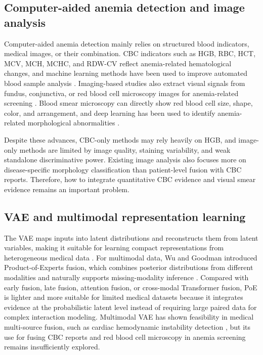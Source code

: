 \documentclass[conference,letterpaper]{IEEEtran}
\begin{document}
\subsection{Computer-aided anemia detection and image analysis}

Computer-aided anemia detection mainly relies on structured blood indicators, medical images, or their combination. CBC indicators such as HGB, RBC, HCT, MCV, MCH, MCHC, and RDW-CV reflect anemia-related hematological changes, and machine learning methods have been used to improve automated blood sample analysis \cite{ref4}. Imaging-based studies also extract visual signals from fundus, conjunctiva, or red blood cell microscopy images for anemia-related screening \cite{ref5}. Blood smear microscopy can directly show red blood cell size, shape, color, and arrangement, and deep learning has been used to identify anemia-related morphological abnormalities \cite{ref6,ref7}.

Despite these advances, CBC-only methods may rely heavily on HGB, and image-only methods are limited by image quality, staining variability, and weak standalone discriminative power. Existing image analysis also focuses more on disease-specific morphology classification than patient-level fusion with CBC reports. Therefore, how to integrate quantitative CBC evidence and visual smear evidence remains an important problem.

\subsection{VAE and multimodal representation learning}

The VAE maps inputs into latent distributions and reconstructs them from latent variables, making it suitable for learning compact representations from heterogeneous medical data \cite{ref8}. For multimodal data, Wu and Goodman introduced Product-of-Experts fusion, which combines posterior distributions from different modalities and naturally supports missing-modality inference \cite{ref9}. Compared with early fusion, late fusion, attention fusion, or cross-modal Transformer fusion, PoE is lighter and more suitable for limited medical datasets because it integrates evidence at the probabilistic latent level instead of requiring large paired data for complex interaction modeling. Multimodal VAE has shown feasibility in medical multi-source fusion, such as cardiac hemodynamic instability detection \cite{ref10}, but its use for fusing CBC reports and red blood cell microscopy in anemia screening remains insufficiently explored.
\end{document}
